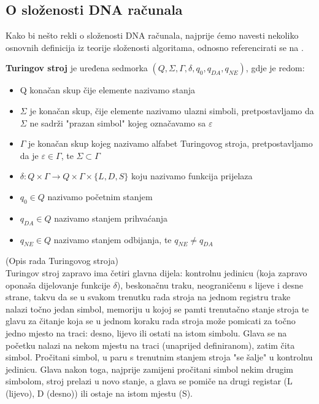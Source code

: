 \documentclass[a4paper,oneside,12pt]{memoir} %
\begin{document}
\begin{spacing}{1.5}
\section{O složenosti DNA računala}
Kako bi nešto rekli o složenosti DNA računala, najprije ćemo navesti nekoliko osnovnih definicija iz teorije složenosti algoritama, odnosno referencirati se na \cite{Sipser}.
\begin{defn}
\textbf{Turingov stroj} je uređena sedmorka $(Q, \Sigma , \Gamma , \delta, q_0, q_{DA}, q_{NE})$, gdje je redom:
\begin{itemize}
	\item Q konačan skup čije elemente nazivamo stanja
	\item $\Sigma$ je konačan skup, čije elemente nazivamo ulazni simboli, pretpostavljamo da $\Sigma$ ne sadrži "prazan simbol" kojeg označavamo sa $\varepsilon$
	\item $\Gamma$ je konačan skup kojeg nazivamo alfabet Turingovog stroja, pretpostavljamo da je $\varepsilon \in \Gamma$, te $\Sigma \subset \Gamma$
	\item $\delta : Q \times \Gamma \to Q \times \Gamma \times \{ L,D,S\}$ koju nazivamo funkcija prijelaza
	\item $q_0 \in Q$ nazivamo početnim stanjem
	\item  $q_{DA} \in Q$ nazivamo stanjem prihvaćanja
	\item $q_{NE} \in Q$ nazivamo stanjem odbijanja, te $q_{NE}\neq q_{DA}$
\end{itemize}
\end{defn}
\begin{rem} (Opis rada Turingovog stroja)\\
Turingov stroj zapravo ima četiri glavna dijela: kontrolnu jedinicu (koja zapravo oponaša dijelovanje funkcije $\delta$), beskonačnu traku, neograničenu s lijeve i desne strane, takvu da se u svakom trenutku rada stroja na jednom registru trake nalazi točno jedan simbol, memoriju u kojoj se pamti trenutačno stanje stroja te glavu za čitanje koja se u jednom koraku rada stroja može pomicati za točno jedno mjesto na traci: desno, lijevo ili ostati na istom simbolu. Glava se na početku nalazi na nekom mjestu na traci (unaprijed definiranom), zatim čita simbol. Pročitani simbol, u paru s trenutnim stanjem stroja "se šalje" u kontrolnu jedinicu. Glava nakon toga, najprije zamijeni pročitani simbol nekim drugim simbolom, stroj prelazi u novo stanje, a glava se pomiče na drugi registar (L (lijevo), D (desno)) ili ostaje na istom mjestu (S). \\

\end{rem}
\end{spacing}
\end{document}

